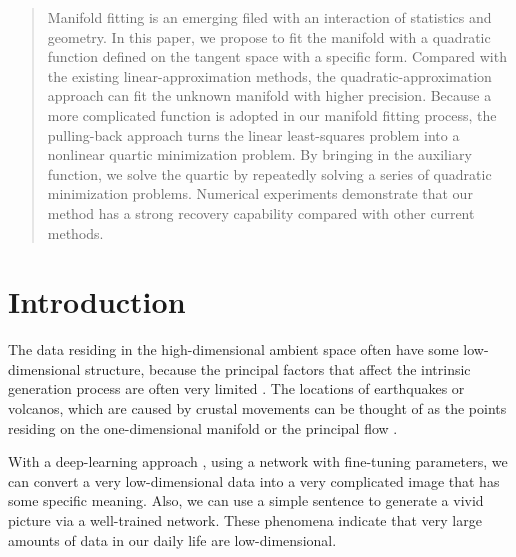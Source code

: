 \documentclass{article}
\theoremstyle{remark}
\begin{document}
\printAffiliationsAndNotice{\icmlEqualContribution} %

\begin{abstract}

Manifold fitting is an emerging filed with an interaction of statistics and geometry. In this paper, we propose to fit the manifold with a quadratic function defined on the tangent space with a specific form. Compared with the existing linear-approximation methods, the quadratic-approximation approach can fit the unknown manifold with higher precision. Because a more complicated function is adopted in our manifold fitting process, the pulling-back approach turns the linear least-squares problem into a nonlinear quartic minimization problem. By bringing in the auxiliary function, we solve the quartic by repeatedly solving a series of quadratic minimization problems. Numerical experiments demonstrate that our method has a strong recovery capability compared with other current methods.

\end{abstract}

\section{Introduction}

The data residing in the high-dimensional ambient space often have some low-dimensional structure, because the principal factors that affect the intrinsic generation process are often very limited \cite{fefferman2016testing}. The locations of earthquakes or volcanos, which are caused by crustal movements can be thought of as the points residing on the one-dimensional manifold or the principal flow \cite{panaretos2014principal,davenport2010joint}.

With a  deep-learning approach \cite{NIPS2014_5ca3e9b1}, using a network with fine-tuning parameters, we can convert a very low-dimensional data into a very complicated image that has some specific meaning. Also, we can use a simple sentence to generate a vivid picture via a well-trained network. These phenomena indicate that very large amounts of data in our daily life are low-dimensional.
\end{document}

